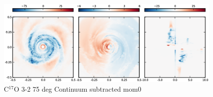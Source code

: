 \documentclass[useAMS,usenatbib]{mn2e}
\begin{document}
\begin{figure}
 \includegraphics[width=198mm]{Figures/sim/imageC17O_3-2_75deg_all.eps}

 \caption{C$^{17}$O 3-2 75 deg Continuum subtracted mom0}
\end{figure}

%
%
%
%
%
%
%


%
\end{document}
